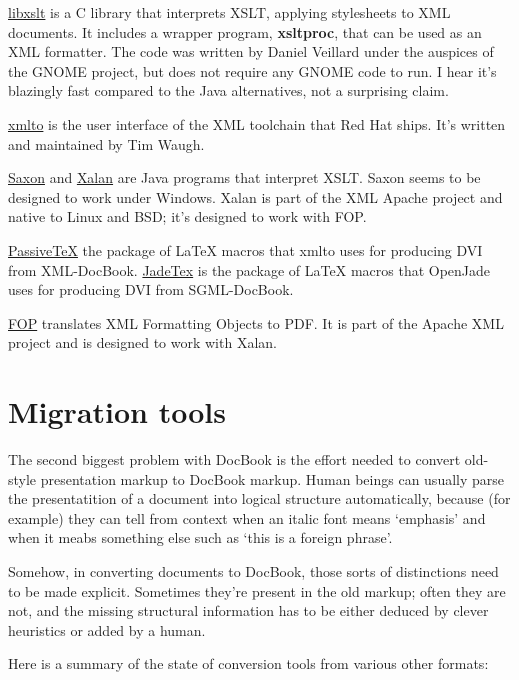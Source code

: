 \documentclass[pdftex,english,a4paper,10pt]{infocom}
\begin{document}
\href{http://xmlsoft.org/XSLT/}{libxslt} is a C
library that interprets XSLT, applying stylesheets to XML documents.
It includes a wrapper program, {\bfseries xsltproc}, that can be
used as an XML formatter.  The code was written by Daniel Veillard
under the auspices of the GNOME project, but does not require any
GNOME code to run.  I hear it's blazingly fast compared to the 
Java alternatives, not a surprising claim.

\href{http://cyberelk.net/tim/xmlto/}{xmlto} is the
user interface of the XML toolchain that Red Hat ships.  It's written
and maintained by Tim Waugh.

\href{http://users.iclway.co.uk/mhkay/saxon/}{Saxon}
and \href{http://xml.apache.org/xalan-j/}{Xalan} are Java
programs that interpret XSLT.  Saxon seems to be designed to work
under Windows.  Xalan is part of the XML Apache project and native to
Linux and BSD; it's designed to work with FOP.

\href{http://users.ox.ac.uk/~rahtz/passivetex/}{PassiveTeX} the
package of LaTeX macros that xmlto uses for
producing DVI from XML-DocBook. \href{http://jadetex.sourceforge.net/}{JadeTex} is the package
of LaTeX macros that OpenJade uses for producing DVI from
SGML-DocBook.

\href{http://xml.apache.org/fop/}{FOP} translates
XML Formatting Objects to PDF.  It is part of the Apache XML project
and is designed to work with Xalan.

\section{Migration tools}
\label{id177362}\hypertarget{id177362}{}%

The second biggest problem with DocBook is the effort needed to
convert old-style presentation markup to DocBook markup.  Human beings
can usually parse the presentatition of a document into logical
structure automatically, because (for example) they can tell from 
context when an italic font means `emphasis' and when it meabs
something else such as `this is a foreign phrase'.

Somehow, in converting documents to DocBook, those
sorts of distinctions need to be made explicit.  Sometimes
they're present in the old markup; often they are not, and the
missing  structural information has to be either deduced by 
clever heuristics or added by a human.

Here is a summary of the state of conversion tools from
various other formats:
\end{document}
